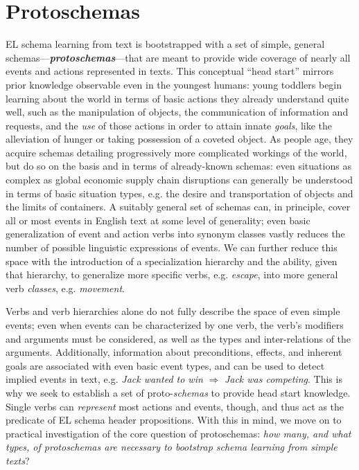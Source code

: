 \section{Protoschemas}
EL schema learning from text is bootstrapped with a set of simple, general schemas---\textit{\textbf{protoschemas}}---that are meant to provide wide coverage of nearly all events and actions represented in texts. This conceptual ``head start'' mirrors prior knowledge observable even in the youngest humans: young toddlers begin learning about the world in terms of basic actions they already understand quite well, such as the manipulation of objects, the communication of information and requests, and the \textit{use} of those actions in order to attain innate \textit{goals}, like the alleviation of hunger or taking possession of a coveted object. As people age, they acquire schemas detailing progressively more complicated workings of the world, but do so on the basis and in terms of already-known schemas: even situations as complex as global economic supply chain disruptions can generally be understood in terms of basic situation types, e.g. the desire and transportation of objects and the limits of containers.
A suitably general set of schemas can, in principle, cover all or most events in English text at some level of generality; even basic generalization of event and action verbs into synonym classes vastly reduces the number of possible linguistic expressions of events. We can further reduce this space with the introduction of a specialization hierarchy and the ability, given that hierarchy, to generalize more specific verbs, e.g. \textit{escape}, into more general verb \textit{classes}, e.g. \textit{movement}.

Verbs and verb hierarchies alone do not fully describe the space of even simple events; even when events can be characterized by one verb, the verb's modifiers and arguments must be considered, as well as the types and inter-relations of the arguments. Additionally, information about preconditions, effects, and inherent goals are associated with even basic event types, and can be used to detect implied events in text, e.g. \textit{Jack wanted to win} $\Rightarrow$ \textit{Jack was competing}.
This is why we seek to establish a set of proto-\textit{schemas} to provide head start knowledge.
Single verbs can \textit{represent} most actions and events, though, and thus act as the predicate of EL schema header propositions. With this in mind, we move on to practical investigation of the core question of protoschemas: \textit{how many, and what types, of protoschemas are necessary to bootstrap schema learning from simple texts}?

